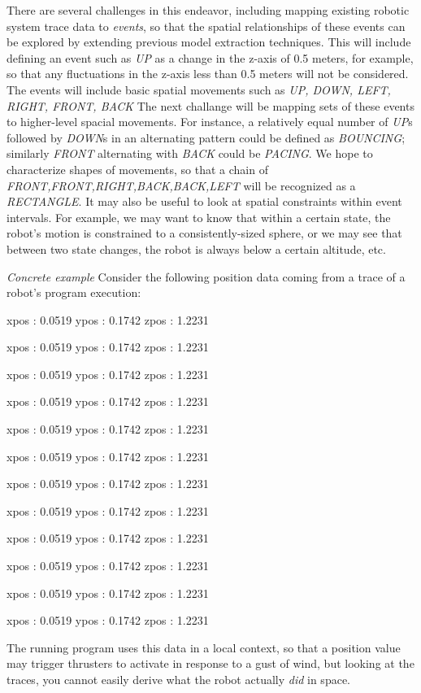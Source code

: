 \documentclass{article}
\begin{document}
There are several challenges in this endeavor, including mapping existing robotic system trace data to \emph{events}, so that the spatial relationships of these events can be explored by extending previous model extraction techniques. 
This will include defining an event such as \emph{UP} as a change in the z-axis of 0.5 meters, for example, so that any fluctuations in the z-axis less than 0.5 meters will not be considered.  
The events will include basic spatial movements such as \emph{UP, DOWN, LEFT, RIGHT, FRONT, BACK} 
The next challange will be mapping sets of these events to higher-level spacial movements.  
For instance, a relatively equal number of \emph{UP}s followed by \emph{DOWN}s in an alternating pattern could be defined as \emph{BOUNCING}; similarly \emph{FRONT} alternating with \emph{BACK} could be \emph{PACING}.
We hope to characterize shapes of movements, so that a chain of \emph{FRONT,FRONT,RIGHT,BACK,BACK,LEFT} will be recognized as a \emph{RECTANGLE}.
It may also be useful to look at spatial constraints within event intervals.  
For example, we may want to know that within a certain state, the robot's motion is constrained to a consistently-sized sphere, or we may see that between two state changes, the robot is always below a certain altitude, etc.

\emph{Concrete example}
Consider the following position data coming from a trace of a robot's program execution:


xpos : 0.0519  ypos : 0.1742  zpos : 1.2231

xpos : 0.0519  ypos : 0.1742  zpos : 1.2231

xpos : 0.0519  ypos : 0.1742  zpos : 1.2231

xpos : 0.0519  ypos : 0.1742  zpos : 1.2231

xpos : 0.0519  ypos : 0.1742  zpos : 1.2231

xpos : 0.0519  ypos : 0.1742  zpos : 1.2231

xpos : 0.0519  ypos : 0.1742  zpos : 1.2231

xpos : 0.0519  ypos : 0.1742  zpos : 1.2231

xpos : 0.0519  ypos : 0.1742  zpos : 1.2231

xpos : 0.0519  ypos : 0.1742  zpos : 1.2231

xpos : 0.0519  ypos : 0.1742  zpos : 1.2231

xpos : 0.0519  ypos : 0.1742  zpos : 1.2231

The running program uses this data in a local context, so that a position value may trigger thrusters to activate in response to a gust of wind, but looking at the traces, you cannot easily derive what the robot actually \emph{did} in space.
\end{document}
